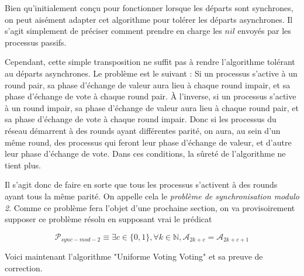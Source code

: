 \documentclass{article}
\begin{document}
Bien qu'initialement conçu pour fonctionner lorsque les départs sont synchrones, on peut aisément adapter cet algorithme pour tolérer les départs asynchrones.
Il s'agit simplement de préciser comment prendre en charge les $nil$ envoyés par les processus passifs.

Cependant, cette simple transposition ne suffit pas à rendre l'algorithme tolérant au départs asynchrones. Le problème est le suivant :
Si un processus s'active à un round pair, sa phase d'échange de valeur aura lieu à chaque round impair, et sa phase d'échange de vote à chaque round pair.
À l'inverse,
si un processus s'active à un round impair, sa phase d'échange de valeur aura lieu à chaque round pair, et sa phase d'échange de vote à chaque round impair.
Donc si les processus du réseau démarrent à des rounds ayant différentes parité, on aura, au sein d'un même round,
des processus qui feront leur phase d'échange de valeur, et d'autre leur phase d'échange de vote.
Dans ces conditions, la sûreté de l'algorithme ne tient plus.

Il s'agit donc de faire en sorte que tous les processus s'activent à des rounds ayant tous la même parité. 
On appelle cela le \emph{problème de synchronisation modulo 2}.
Comme ce problème fera l'objet d'une prochaine section, on va provisoirement supposer ce problème résolu en supposant vrai le prédicat 

$$\mathcal{P}_{sync-mod-2} \equiv \exists c \in \{0, 1\}, \forall k \in \mathds{N}, \mathcal{A}_{2k+c} = \mathcal{A}_{2k+c+1}$$

Voici maintenant l'algorithme "Uniforme Voting	Voting" et sa preuve de correction.
\end{document}
